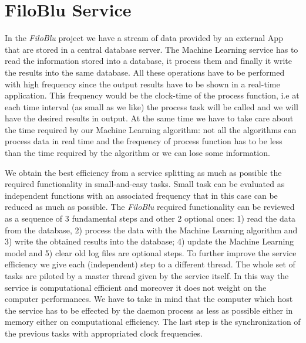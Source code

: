 \documentclass{standalone}
\begin{document}
\section*{FiloBlu Service}

In the \emph{FiloBlu} project we have a stream of data provided by an external App that are stored in a central database server.
The Machine Learning service has to read the information stored into a database, it process them and finally it write the results into the same database.
All these operations have to be performed with high frequency since the output results have to be shown in a real-time application.
This frequency would be the clock-time of the process function, i.e at each time interval (as small as we like) the process task will be called and we will have the desired results in output.
At the same time we have to take care about the time required by our Machine Learning algorithm: not all the algorithms can process data in real time and the frequency of process function has to be less than the time required by the algorithm or we can lose some information.

We obtain the best efficiency from a service splitting as much as possible the required functionality in small-and-easy tasks.
Small task can be evaluated as independent functions with an associated frequency that in this case can be reduced as much as possible.
The \emph{FiloBlu} required functionality can be reviewed as a sequence of 3 fundamental steps and other 2 optional ones: 1) read the data from the database, 2) process the data with the Machine Learning algorithm and 3) write the obtained results into the database; 4) update the Machine Learning model and 5) clear old log files are optional steps.
To further improve the service efficiency we give each (independent) step to a different thread.
The whole set of tasks are piloted by a master thread given by the service itself.
In this way the service is computational efficient and moreover it does not weight on the computer performances.
We have to take in mind that the computer which host the service has to be effected by the daemon process as less as possible either in memory either on computational efficiency.
The last step is the synchronization of the previous tasks with appropriated clock frequencies.
\end{document}
